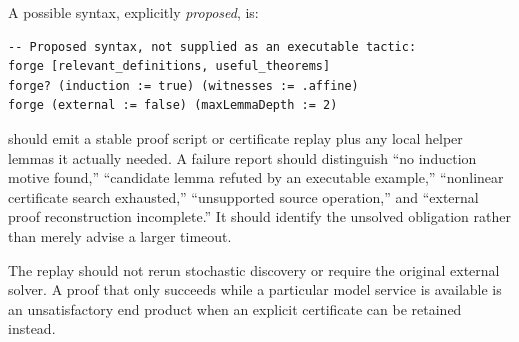 A possible syntax, explicitly \emph{proposed}, is:
\begin{lstlisting}
-- Proposed syntax, not supplied as an executable tactic:
forge [relevant_definitions, useful_theorems]
forge? (induction := true) (witnesses := .affine)
forge (external := false) (maxLemmaDepth := 2)
\end{lstlisting}

 should emit a stable proof script or certificate replay plus any
local helper lemmas it actually needed. A failure report should distinguish
``no induction motive found,'' ``candidate lemma refuted by an executable
example,'' ``nonlinear certificate search exhausted,'' ``unsupported source
operation,'' and ``external proof reconstruction incomplete.'' It should
identify the unsolved obligation rather than merely advise a larger timeout.

The replay should not rerun stochastic discovery or require the original
external solver. A proof that only succeeds while a particular model service
is available is an unsatisfactory end product when an explicit certificate
can be retained instead.
